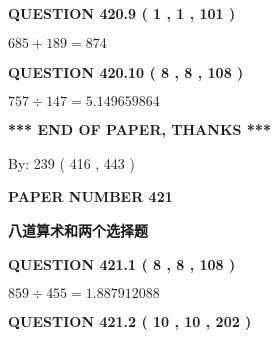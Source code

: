 \documentclass{ctexart}
\begin{document}
{\textbf{\Large{QUESTION
420.9 
 ( 1 , 1 , 101 )
}}}
  
  
 
 

$ %
685 +  %
189=   %
874$
 
 
  
\vspace{0.2in}
  
{\textbf{\Large{QUESTION
420.10 
 ( 8 , 8 , 108 )
}}}
  
  
 
 

$ %
757 \div  %
147=   %
5.149659864$
 
 
   
   
 \vspace{0.2in}
 
   
   
   
   
\vspace{1.0in} 
{\textbf{\large{ *** END OF PAPER, THANKS *** }}} 
   
   
\hspace{1.0in} By: 
 239 ( 416 ,  443 )
   
   
   
   
\newpage 
\setcounter{page}{ 
   421001 } 
   
   
   
   
 {\textbf{ \Large{ PAPER NUMBER  421  }}}
   
   
\vspace{0.2in}
   
   
   
   
   
   
 \vspace{0.2in}
{\LARGE {\textbf{ 八道算术和两个选择题}}}
   
   
  
\vspace{0.2in}
  
{\textbf{\Large{QUESTION
421.1 
 ( 8 , 8 , 108 )
}}}
  
  
 
 

$ %
859 \div  %
455=   %
1.887912088$
 
 
  
\vspace{0.2in}
  
{\textbf{\Large{QUESTION
421.2 
 ( 10 , 10 , 202 )
}}}
  
\end{document}

